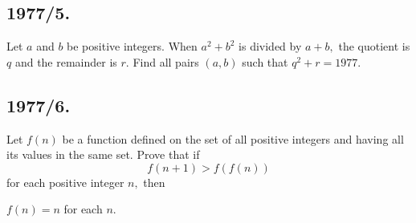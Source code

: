 \documentclass[12pt,thmsa]{article}
\begin{document}
\subsection{1977/5. }

Let $a$ and $b$ be positive integers. When $a^{2}+b^{2}$ is divided by $a+b,$
the quotient is $q$ and the remainder is $r.$ Find all pairs $(a,b)$ such
that $q^{2}+r=1977.$

\subsection{1977/6. }

Let $f(n)$ be a function defined on the set of all positive integers and
having all its values in the same set. Prove that if
\[
f(n+1)>f(f(n))
\]
for each positive integer $n,$ then

\begin{center}
$f(n)=n$ for each $n.$
\end{center}
\end{document}
